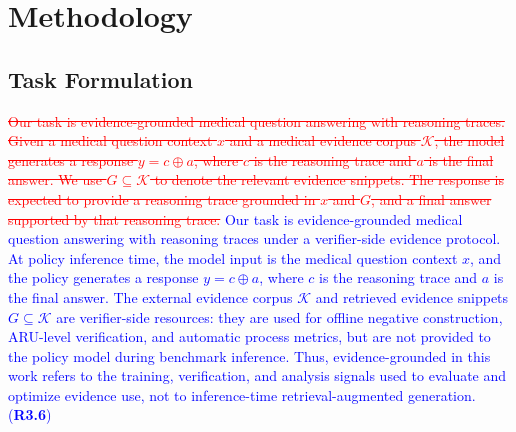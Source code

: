 \documentclass[a4paper,fleqn,doubleblind]{cas-sc}
\DeclareRobustCommand{\deleted}[1]{\textcolor{red}{\sout{#1}}}
\DeclareRobustCommand{\added}[1]{\textcolor{blue}{#1}}
\DeclareRobustCommand{\revtag}[1]{\textcolor{blue}{\scriptsize\,(\textbf{#1})}}
\begin{document}
\section{Methodology}

\subsection{Task Formulation}
\label{sec:formulation}

\deleted{Our task is evidence-grounded medical question answering with reasoning traces. Given a medical question context $x$ and a medical evidence corpus $\mathcal{K}$, the model generates a response $y=c\oplus a$, where $c$ is the reasoning trace and $a$ is the final answer. We use $G \subseteq \mathcal{K}$ to denote the relevant evidence snippets. The response is expected to provide a reasoning trace grounded in $x$ and $G$, and a final answer supported by that reasoning trace.}
\added{Our task is evidence-grounded medical question answering with reasoning traces under a verifier-side evidence protocol. At policy inference time, the model input is the medical question context $x$, and the policy generates a response $y=c\oplus a$, where $c$ is the reasoning trace and $a$ is the final answer. The external evidence corpus $\mathcal{K}$ and retrieved evidence snippets $G \subseteq \mathcal{K}$ are verifier-side resources: they are used for offline negative construction, ARU-level verification, and automatic process metrics, but are not provided to the policy model during benchmark inference. Thus, evidence-grounded in this work refers to the training, verification, and analysis signals used to evaluate and optimize evidence use, not to inference-time retrieval-augmented generation.}\revtag{R3.6}
\end{document}
